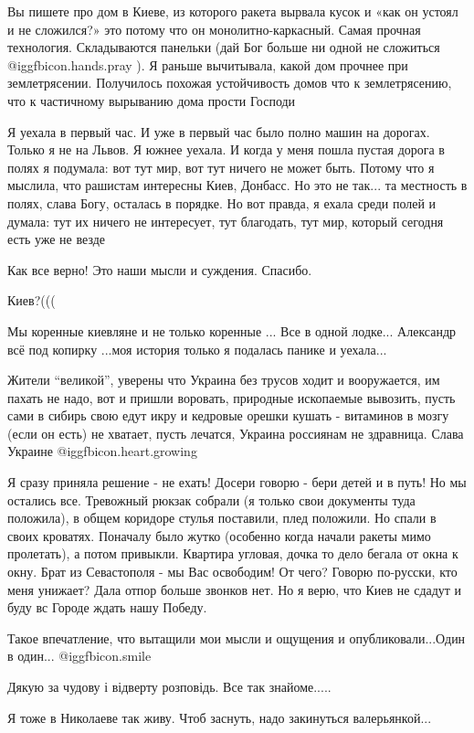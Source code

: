 \begin{itemize}

Вы пишете про дом в Киеве, из которого ракета вырвала кусок и «как он устоял и
не сложился?» это потому что он монолитно-каркасный. Самая прочная технология.
Складываются панельки (дай Бог больше ни одной не сложиться  @igg{fbicon.hands.pray} ). Я раньше
вычитывала, какой дом прочнее при землетрясении. Получилось похожая
устойчивость домов что к землетрясению, что к частичному вырыванию дома прости
Господи


Я уехала в первый час. И уже в первый час было полно машин на дорогах. Только я
не на Львов. Я южнее уехала. И когда у меня пошла пустая дорога в полях я
подумала: вот тут мир, вот тут ничего не может быть. Потому что я мыслила, что
рашистам интересны Киев, Донбасс. Но это не так... та местность в полях, слава
Богу, осталась в порядке. Но вот правда, я ехала среди полей и думала: тут их
ничего не интересует, тут благодать, тут мир, который сегодня есть уже не везде

Как все верно! Это наши мысли и суждения. Спасибо.

Киев?(((



Мы коренные киевляне и не только коренные ... Все в одной лодке... Александр
всё под копирку ...моя история только я подалась панике и уехала...


Жители \enquote{великой}, уверены что Украина без трусов ходит и вооружается, им пахать
не надо, вот и пришли воровать, природные ископаемые вывозить, пусть сами в
сибирь свою едут икру и кедровые орешки кушать - витаминов в мозгу (если он есть)
не хватает, пусть лечатся, Украина россиянам не здравница. Слава Украине @igg{fbicon.heart.growing} 


Я сразу приняла решение - не ехать! Досери говорю - бери детей и в путь! Но мы
остались все. Тревожный рюкзак собрали (я только свои документы туда положила),
в общем коридоре стулья поставили, плед положили. Но спали в своих кроватях.
Поначалу было жутко (особенно когда начали ракеты мимо пролетать), а потом
привыкли. Квартира угловая, дочка то дело бегала от окна к окну. Брат из
Севастополя - мы Вас освободим! От чего? Говорю по-русски, кто меня унижает?
Дала отпор больше звонков нет. Но я верю, что Киев не сдадут и буду вс Городе
ждать нашу Победу.

Такое впечатление, что вытащили мои мысли и ощущения и опубликовали...Один в один... @igg{fbicon.smile} 

Дякую за чудову і відверту розповідь. Все так знайоме.....

Я тоже в Николаеве так живу. Чтоб заснуть, надо закинуться валерьянкой...

\end{itemize} %
